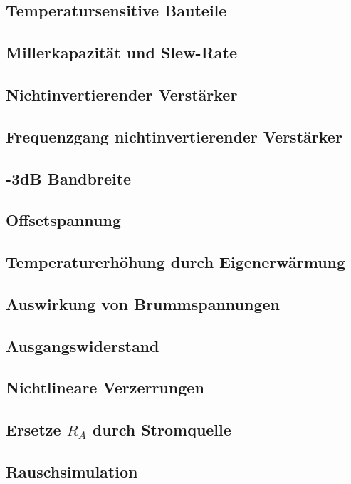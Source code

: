 \subsection{Temperatursensitive Bauteile}

\subsection{Millerkapazität und Slew-Rate}

\subsection{Nichtinvertierender Verstärker}

\subsection{Frequenzgang nichtinvertierender Verstärker}

\subsection{-3dB Bandbreite}

\subsection{Offsetspannung}

\subsection{Temperaturerhöhung durch Eigenerwärmung}

\subsection{Auswirkung von Brummspannungen}

\subsection{Ausgangswiderstand}

\subsection{Nichtlineare Verzerrungen}

\subsection{Ersetze $R_A$ durch Stromquelle}

\subsection{Rauschsimulation}



